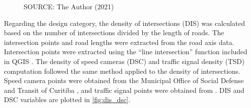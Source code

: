 \begin{figure}[!htbp]
\begin{subfigure}{0.5\textwidth}
    \end{subfigure}    
    \label{fig:pd_ldi}
    \par SOURCE: The Author (2021)
\end{figure}

Regarding the design category, the density of intersections (DIS) was calculated based on the number of intersections divided by the length of roads. The intersection points and road lengths were extracted from the \textcite{IPPUC2021} road axis data. Intersection points were extracted using the ``line intersection'' function included in QGIS \cite{QGIS_software}. The density of speed cameras (DSC) and traffic signal density (TSD) computation followed the same method applied to the density of intersections. Speed camera points were obtained from the Municipal Office of Social Defense and Transit of Curitiba \cite{SETRAN2020}, and traffic signal points were obtained from \textcite{IPPUC2021}. DIS and DSC variables are plotted in \autoref{fig:dis_dsc}. 

